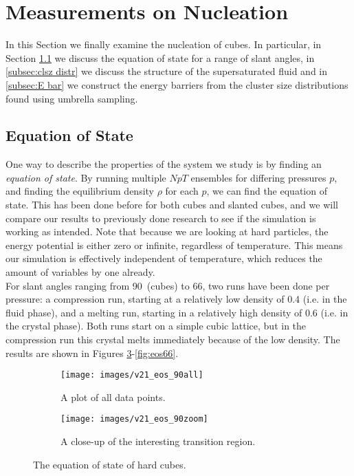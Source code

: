 \documentclass[thesis]{subfiles}
\begin{document}
\section{Measurements on Nucleation}

In this Section we finally examine the nucleation of cubes. In particular, in Section \ref{subsec:eos} we discuss the equation of state for a range of slant angles, in \ref{subsec:clsz distr} we discuss the structure of the supersaturated fluid and in \ref{subsec:E bar} we construct the energy barriers from the cluster size distributions found using umbrella sampling.

\subsection{Equation of State}\label{subsec:eos}

One way to describe the properties of the system we study is by finding an \emph{equation of state}. By running multiple $NpT$ ensembles for differing pressures $p$, and finding the equilibrium density $\rho$ for each $p$, we can find the equation of state. This has been done before for both cubes and slanted cubes\cite{van2017phase}, and we will compare our results to previously done research to see if the simulation is working as intended. Note that because we are looking at hard particles, the energy potential is either zero or infinite, regardless of temperature. This means our simulation is effectively independent of temperature, which reduces the amount of variables by one already.\\

For slant angles ranging from 90\degr\ (cubes) to 66\degr, two runs have been done per pressure: a compression run, starting at a relatively low density of 0.4 (i.e. in the fluid phase), and a melting run, starting in a relatively high density of 0.6 (i.e. in the crystal phase). Both runs start on a simple cubic lattice, but in the compression run this crystal melts immediately because of the low density. The results are shown in Figures \ref{fig:eos90}-\ref{fig:eos66}. 

\begin{figure}[h]
	\begin{subfigure}[t]{0.475\textwidth}
		\texttt{[image: images/v21\_eos\_90all]}
		\caption{A plot of all data points.}
		\label{fig:eos90-a}
	\end{subfigure}\hfill
	\begin{subfigure}[t]{0.475\textwidth}
		\texttt{[image: images/v21\_eos\_90zoom]}
		\caption{A close-up of the interesting transition region.}
		\label{fig:eos90-b}
	\end{subfigure}
	\caption{The equation of state of hard cubes.}
	\label{fig:eos90}
\end{figure}
\end{document}
